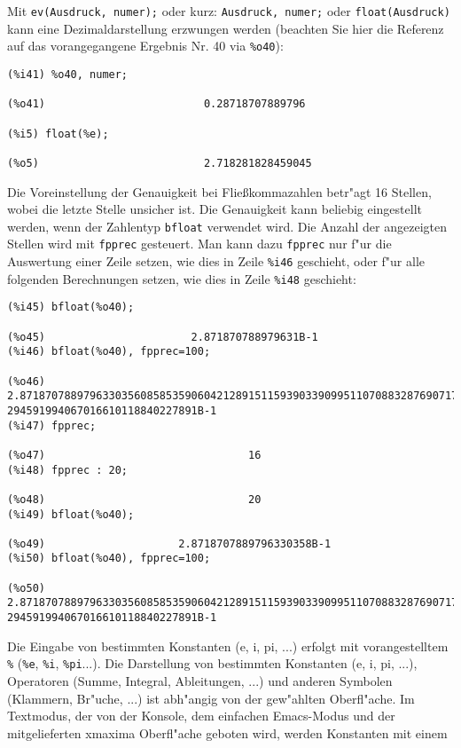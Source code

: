 \documentclass[spanish,12pt,a4paper]{article}
\begin{document}
Mit \verb|ev(Ausdruck, numer);| oder kurz: \verb|Ausdruck, numer;| oder \verb|float(Ausdruck)| kann eine Dezimaldarstellung erzwungen werden (beachten Sie hier die Referenz auf das vorangegangene Ergebnis Nr. 40 via \verb|%o40|):

\scriptsize
\begin{verbatim}
(%i41) %o40, numer;

(%o41)                         0.28718707889796

(%i5) float(%e);

(%o5)                          2.718281828459045
\end{verbatim}
\normalsize

Die Voreinstellung der Genauigkeit bei Fließkommazahlen betr"agt 16 Stellen, wobei die letzte Stelle unsicher ist. Die Genauigkeit kann beliebig eingestellt werden, wenn der Zahlentyp \verb|bfloat| verwendet wird. Die Anzahl der angezeigten Stellen wird mit \verb|fpprec| gesteuert. Man kann dazu \verb|fpprec| nur f"ur die Auswertung einer Zeile setzen, wie dies in Zeile \verb|%i46| geschieht, oder f"ur alle folgenden Berechnungen setzen, wie dies in Zeile \verb|%i48| geschieht:

\scriptsize
\begin{verbatim}
(%i45) bfloat(%o40);

(%o45)                       2.871870788979631B-1
(%i46) bfloat(%o40), fpprec=100;

(%o46) 2.871870788979633035608585359060421289151159390339099511070883287690717#
294591994067016610118840227891B-1
(%i47) fpprec;

(%o47)                                16
(%i48) fpprec : 20;

(%o48)                                20
(%i49) bfloat(%o40);

(%o49)                     2.8718707889796330358B-1
(%i50) bfloat(%o40), fpprec=100;

(%o50) 2.871870788979633035608585359060421289151159390339099511070883287690717#
294591994067016610118840227891B-1
\end{verbatim}
\normalsize


Die Eingabe von bestimmten Konstanten (e, i, pi, ...) erfolgt mit vorangestelltem \verb|%| (\verb|%e|, \verb|%i|, \verb|%pi|...).
Die Darstellung von bestimmten Konstanten (e, i, pi, ...), Operatoren (Summe, Integral, Ableitungen, ...) und anderen Symbolen (Klammern, Br"uche, ...) ist abh"angig von der gew"ahlten Oberfl"ache. Im Textmodus, der von der Konsole, dem einfachen Emacs-Modus und der mitgelieferten xmaxima Oberfl"ache geboten wird, werden Konstanten mit einem %
\end{document}
